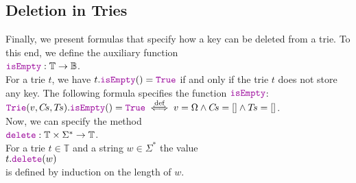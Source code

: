 \subsection{Deletion in Tries}
Finally, we present formulas that specify how a key can be deleted from a trie.
To this end, we define the auxiliary function
\\[0.2cm]
\hspace*{1.3cm} 
$\mytt{isEmpty}: \mathbb{T} \rightarrow \mathbb{B}$.
\\[0.2cm]
For a trie $t$, we have $t.\mytt{isEmpty}() = \mytt{True}$ if and only if the trie $t$ does not
store any key.  The following formula specifies the function $\mytt{isEmpty}$:
\\[0.2cm]
\hspace*{1.3cm}
$\mytt{Trie}(v, C\!s, T\!s).\mytt{isEmpty}() = \mytt{True} \;\stackrel{\textrm{def}}{\Longleftrightarrow}\; 
 v = \Omega \wedge C\!s = [] \wedge T\!s = []
$.
\\[0.2cm]
Now, we can specify the method
\\[0.2cm]
\hspace*{1.3cm}
$\mytt{delete}: \mathbb{T} \times \Sigma^* \rightarrow \mathbb{T}$.
\\[0.2cm]
For a trie  $t \in \mathbb{T}$ and a string $w \in \Sigma^*$ the value 
 \\[0.2cm]
\hspace*{1.3cm} 
$t.\mytt{delete}(w)$
\\[0.2cm]
is defined by induction on the length of  $w$.
